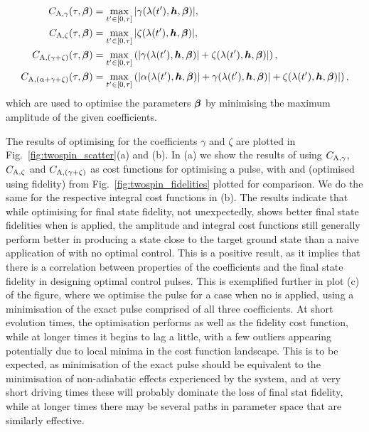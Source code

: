 \begin{equation}\label{eq:twospin_costfunc_amp}
    \begin{aligned}
        C_{\rm A, \gamma}(\tau, \boldsymbol{\beta}) &= \max_{t^{\prime} \in [0,\tau]} | \gamma(\lambda(t^{\prime}), \boldsymbol{h}, \boldsymbol{\beta})|,\\
        C_{\rm A, \zeta}(\tau, \boldsymbol{\beta}) &= \max_{t^{\prime} \in [0,\tau]} | \zeta(\lambda(t^{\prime}), \boldsymbol{h}, \boldsymbol{\beta})|,\\
        C_{\rm A, (\gamma + \zeta)}(\tau, \boldsymbol{\beta}) &= \max_{t^{\prime} \in [0,\tau]} \left(| \gamma(\lambda(t^{\prime}), \boldsymbol{h}, \boldsymbol{\beta})| + \zeta(\lambda(t^{\prime}), \boldsymbol{h}, \boldsymbol{\beta})| \right),\\
        C_{\rm A, (\alpha + \gamma + \zeta)}(\tau, \boldsymbol{\beta}) &= \max_{t^{\prime} \in [0,\tau]} \left(| \alpha(\lambda(t^{\prime}), \boldsymbol{h}, \boldsymbol{\beta})| + \gamma(\lambda(t^{\prime}), \boldsymbol{h}, \boldsymbol{\beta})| + \zeta(\lambda(t^{\prime}), \boldsymbol{h}, \boldsymbol{\beta})| \right),
    \end{aligned}
\end{equation}
which are used to optimise the parameters $\boldsymbol{\beta}$ by minimising the maximum amplitude of the given  coefficients.

The results of optimising for the   coefficients $\gamma$ and $\zeta$ are plotted in Fig.~\ref{fig:twospin_scatter}(a) and (b). In (a) we show the results of using $C_{\rm A, \gamma}$, $C_{\rm A, \zeta}$ and $C_{\rm A, (\gamma + \zeta)}$ as cost functions for optimising a   pulse, with   and   (optimised using fidelity) from Fig.~\ref{fig:twospin_fidelities} plotted for comparison. We do the same for the respective integral cost functions in (b). The results indicate that while optimising for final state fidelity, not unexpectedly, shows better final state fidelities when  is applied, the amplitude and integral cost functions still generally perform better in producing a state close to the target ground state than a naive application of   with no optimal control. This is a positive result, as it implies that there is a correlation between properties of the  coefficients and the final state fidelity in designing optimal control pulses. This is exemplified further in plot (c) of the figure, where we optimise the pulse for a case when no  is applied, using a minimisation of the exact  pulse comprised of all three  coefficients. At short evolution times, the optimisation performs as well as the fidelity cost function, while at longer times it begins to lag a little, with a few outliers appearing potentially due to local minima in the cost function landscape. This is to be expected, as minimisation of the exact  pulse should be equivalent to the minimisation of non-adiabatic effects experienced by the system, and at very short driving times these will probably dominate the loss of final stat fidelity, while at longer times there may be several paths in parameter space that are similarly effective. 

